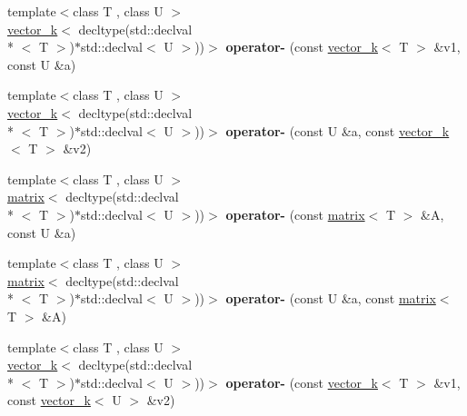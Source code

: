 \begin{DoxyCompactItemize}
\item 
\hypertarget{namespacekeycpp_a520b72efca1fbe800845b21a84d2d472}{{\footnotesize template$<$class T , class U $>$ }\\\hyperlink{classkeycpp_1_1vector__k}{vector\-\_\-k}$<$ decltype(std\-::declval\\*
$<$ T $>$)$\ast$std\-::declval$<$ U $>$))$>$ {\bfseries operator-\/} (const \hyperlink{classkeycpp_1_1vector__k}{vector\-\_\-k}$<$ T $>$ \&v1, const U \&a)}\label{namespacekeycpp_a520b72efca1fbe800845b21a84d2d472}

\item 
\hypertarget{namespacekeycpp_a1222c1fe6037feb8eacf0d2bd5152751}{{\footnotesize template$<$class T , class U $>$ }\\\hyperlink{classkeycpp_1_1vector__k}{vector\-\_\-k}$<$ decltype(std\-::declval\\*
$<$ T $>$)$\ast$std\-::declval$<$ U $>$))$>$ {\bfseries operator-\/} (const U \&a, const \hyperlink{classkeycpp_1_1vector__k}{vector\-\_\-k}$<$ T $>$ \&v2)}\label{namespacekeycpp_a1222c1fe6037feb8eacf0d2bd5152751}

\item 
\hypertarget{namespacekeycpp_a71a8f2ebc458f06e29b17ecc28ed000d}{{\footnotesize template$<$class T , class U $>$ }\\\hyperlink{classkeycpp_1_1matrix}{matrix}$<$ decltype(std\-::declval\\*
$<$ T $>$)$\ast$std\-::declval$<$ U $>$))$>$ {\bfseries operator-\/} (const \hyperlink{classkeycpp_1_1matrix}{matrix}$<$ T $>$ \&A, const U \&a)}\label{namespacekeycpp_a71a8f2ebc458f06e29b17ecc28ed000d}

\item 
\hypertarget{namespacekeycpp_a4bc853f9410d964ef9f163ce53ea4828}{{\footnotesize template$<$class T , class U $>$ }\\\hyperlink{classkeycpp_1_1matrix}{matrix}$<$ decltype(std\-::declval\\*
$<$ T $>$)$\ast$std\-::declval$<$ U $>$))$>$ {\bfseries operator-\/} (const U \&a, const \hyperlink{classkeycpp_1_1matrix}{matrix}$<$ T $>$ \&A)}\label{namespacekeycpp_a4bc853f9410d964ef9f163ce53ea4828}

\item 
\hypertarget{namespacekeycpp_a891589b60d1c968b44986f3b7d56586b}{{\footnotesize template$<$class T , class U $>$ }\\\hyperlink{classkeycpp_1_1vector__k}{vector\-\_\-k}$<$ decltype(std\-::declval\\*
$<$ T $>$)$\ast$std\-::declval$<$ U $>$))$>$ {\bfseries operator-\/} (const \hyperlink{classkeycpp_1_1vector__k}{vector\-\_\-k}$<$ T $>$ \&v1, const \hyperlink{classkeycpp_1_1vector__k}{vector\-\_\-k}$<$ U $>$ \&v2)}\label{namespacekeycpp_a891589b60d1c968b44986f3b7d56586b}


\end{DoxyCompactItemize}
